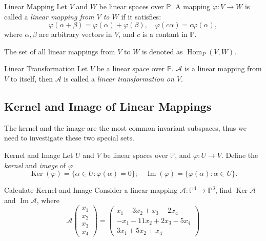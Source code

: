 \begin{definition}{Linear Mapping}{}
  Let $V$ and $W$ be linear spaces over $\mathbb{P}$.
  A mapping $\varphi: V \rightarrow W$ is called a \emph{linear mapping from $V$
  to $W$}
  if it satisfies:
  \begin{equation}
    \varphi(\alpha + \beta) = \varphi(\alpha) + \varphi(\beta), \quad
    \varphi(c \alpha) = c \varphi(\alpha),
  \end{equation}
  where $\alpha, \beta$ are arbitrary vectors in $V$,
  and $c$ is a contant in $\mathbb{P}$.
\end{definition}

\begin{note}
  The set of all linear mappings from $V$ to $W$ is denoted as $\operatorname{Hom}_P(V, W)$.
\end{note}

\begin{definition}{Linear Transformation}{}
  Let $V$ be a linear space over $\mathbb{P}$.
  $\mathcal{A}$ is a linear mapping from $V$ to itself,
  then $\mathcal{A}$ is called a \emph{linear transformation on $V$}.
\end{definition}

\subsection{Kernel and Image of Linear Mappings}

The kernel and the image are the most common invariant subspaces,
thus we need to investigate these two special sets.

\begin{definition}{Kernel and Image}{}
  Let $U$ and $V$ be linear spaces over $\mathbb{P}$,
  and $\varphi: U \rightarrow V$.
  Define the \emph{kernel} and \emph{image} of $\varphi$
  \begin{equation}
    \operatorname{Ker} (\varphi) = \{\alpha \in U: \varphi (\alpha) = 0\}; \quad
    \operatorname{Im} (\varphi) = \{\varphi (\alpha) : \alpha \in U\}.
  \end{equation}
\end{definition}

\begin{example}{Calculate Kernel and Image}{}
  Consider a linear mapping $\mathcal{A}: \mathbb{P}^4 \rightarrow
  \mathbb{P}^3$,
  find $\operatorname{Ker} \mathcal{A}$ and $\operatorname{Im} \mathcal{A}$, where
  \begin{equation}
    \mathcal{A}\begin{pmatrix}
    x_1 \\
    x_2 \\
    x_3 \\
    x_4
    \end{pmatrix}
    =
    \begin{pmatrix}
    x_1 - 3x_2 + x_3 - 2x_4 \\
    -x_1 - 11x_2 + 2x_3 - 5x_4 \\
    3x_1 + 5x_2 + x_4
    \end{pmatrix}
  \end{equation}
\end{example}

